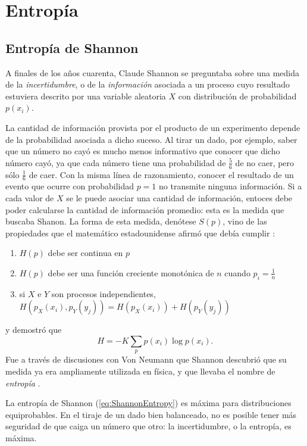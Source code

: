 \section{Entropía}
\subsection{Entropía de Shannon}
A finales de los años cuarenta, Claude Shannon se preguntaba sobre una medida de la \textit{incertidumbre}, o de la \textit{información} asociada a un proceso cuyo resultado estuviera descrito por una variable aleatoria $X$ con distribución de probabilidad $p(x_{i})$.

La cantidad de información provista por el producto de un experimento depende de la probabilidad asociada a dicho suceso. Al tirar un dado, por ejemplo, saber que un número no cayó es mucho menos informativo que conocer que dicho número cayó, ya que cada número tiene una probabilidad de $\frac{5}{6}$ de no caer, pero sólo $\frac{1}{6}$ de caer. Con la misma línea de razonamiento, conocer el resultado de un evento que ocurre con probabilidad $p=1$ no transmite ninguna información. Si a cada valor de $X$ se le puede asociar una cantidad de información, entoces debe poder calcularse la cantidad de información promedio: esta es la medida que buscaba Shanon. La forma de esta medida, denótese $S(p)$, vino de las propiedades que el matemático estadounidense afirmó que debía cumplir \cite{Shannon} \cite{Wilde}:
\begin{enumerate}
    \item $H(p)$ debe ser continua en $p$
    \item $H(p)$ debe ser una función creciente monotónica de $n$ cuando $p_{i}=\frac{1}{n}$
    \item si $X$ e $Y$ son procesos independientes, $H(p_{X}(x_{i}),p_{Y}(y_{j}))=H(p_{X}(x_{i}))+H(p_{Y}(y_{j}))$
\end{enumerate}
y demostró que
\begin{equation}\label{eq:ShannonEntropy}
    H=-K\sum_{p}p(x_{i})\log{p(x_{i})}.
\end{equation}
Fue a través de discusiones con Von Neumann que Shannon descubrió que su medida ya era ampliamente utilizada en física, y que llevaba el nombre de \textit{entropía} \cite{McIrvine}.

La entropía de Shannon (\ref{eq:ShannonEntropy}) es máxima para distribuciones equiprobables. En el tiraje de un dado bien balanceado, no es posible tener más seguridad de que caiga un número que otro: la incertidumbre, o la entropía, es máxima.

